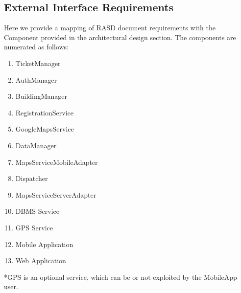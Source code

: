 	\subsection {External Interface Requirements}
	Here we provide a mapping of RASD document requirements with the Component provided in the architectural design section. The components are numerated as follows:
	\renewcommand{\theenumi}{[C\,\arabic{enumi}]}
	\begin{enumerate}
	\item TicketManager
	\item AuthManager
	\item BuildingManager
	\item RegistrationService
	\item GoogleMapsService
	\item DataManager
	\item MapsServiceMobileAdapter
	\item Dispatcher
	\item MapsServiceServerAdapter
	\item DBMS Service
	\item GPS Service
	\item Mobile Application
	\item Web Application
	\end{enumerate}
*GPS is an optional service, which can be or not exploited by the MobileApp user.
\newpage

